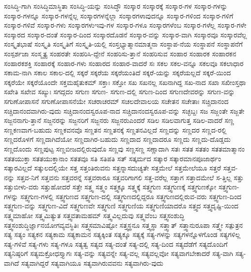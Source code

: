 {ಸಂಸಿದ್ಧಿ-ಗಾಗಿ
ಸಂಸಿದ್ಧಿಮಾಸ್ಥಿತಾ
ಸಂಸಿದ್ಧಿ-ಯನ್ನು
ಸಂಸಿದ್ಧೌ
ಸಂಸ್ಕಾರ
ಸಂಸ್ಕಾರಕ್ಕೆ
ಸಂಸ್ಕಾರ-ಗಳ
ಸಂಸ್ಕಾರ-ಗಳನ್ನು
ಸಂಸ್ಕಾರ-ಗಳನ್ನೂ
ಸಂಸ್ಕಾರ-ಗಳನ್ನೆಲ್ಲ
ಸಂಸ್ಕಾರಗಳನ್ನೆಲ್ಲಾ
ಸಂಸ್ಕಾರಗಳಾವುದನ್ನೂ
ಸಂಸ್ಕಾರ-ಗಳಿಂದ
ಸಂಸ್ಕಾರ-ಗಳಿಗೆ
ಸಂಸ್ಕಾರ-ಗಳಿವೆ
ಸಂಸ್ಕಾರ-ಗಳು
ಸಂಸ್ಕಾರಗಳುಇವು-ಗಳ
ಸಂಸ್ಕಾರ-ಗಳೂ
ಸಂಸ್ಕಾರಗಳೆಂಬ
ಸಂಸ್ಕಾರ-ಗಳೆಲ್ಲ
ಸಂಸ್ಕಾರ-ಗಳೇ
ಸಂಸ್ಕಾರದ
ಸಂಸ್ಕಾರ-ದಂತೆ
ಸಂಸ್ಕಾರ-ದಿಂದ
ಸಂಸ್ಕಾರದೊಡನೆ
ಸಂಸ್ಕಾರ-ವನ್ನು
ಸಂಸ್ಕಾರ-ವಾಗಿ
ಸಂಸ್ಕಾರವೂ
ಸಂಸ್ಕಾರವೆಲ್ಲ
ಸಂಸ್ಕೃತಭಾಷೆ
ಸಂಸ್ಕೃತಿ
ಸಂಸ್ಕೃತಿಗೆ
ಸಂಸ್ಕೃತಿ-ಯಲ್ಲಿ
ಸಂಸ್ತಭ್ಯಾತ್ಮಾನಮಾತ್ಮನಾ
ಸಂಸ್ಥಾಪ-ನೆಯ
ಸಂಸ್ಥಾಪನೆ
ಸಂಸ್ಥಾಪನೆಗೆ
ಸಂಸ್ಪರ್ಶಜಾ
ಸಂಸ್ಮೃತ್ಯ
ಸಂಹರತೇ
ಸಂಹರಿಸಿ-ದ್ದೇನೆ
ಸಂಹರಿಸು-ತ್ತಾನೆ
ಸಂಹರಿಸುವ
ಸಂಹಾರ
ಸಂಹಾರಕ
ಸಂಹಾರಕನ
ಸಂಹಾರಕಶಕ್ತಿ
ಸಂಹಾರಕ್ಕೆ
ಸಂಹಾರ-ಗಳು
ಸಂಹಾರದ
ಸಂಹಾರ-ವಾದರೆ
ಸಃ
ಸಕಲ
ಸಕಲ-ವನ್ನೂ
ಸಕಲವೂ
ಸಕಲಾಧಾರ
ಸಕಾಮ-ನಾಗಿ
ಸಕಾಲ
ಸಕಾಲ-ದಲ್ಲಿ
ಸಕ್ಕರೆ
ಸಕ್ಕರೆಯ
ಸಕ್ಕರೆಯಂತಿದೆ
ಸಕ್ಕರೆ-ಯನ್ನು
ಸಕ್ಕರೆಯಲ್ಲದೆ
ಸಕ್ಕರೆ-ಯಿಂದ
ಸಕ್ಕರೆಯೇ
ಸಕ್ಕರೆಯೊಂದೇ
ಸಕ್ತಮಹೈತುಕಮ್
ಸಕ್ತಾಃ
ಸಕ್ತೋ
ಸಖ
ಸಖನಲ್ಲ
ಸಖನಾಗಿದ್ದ
ಸಖ-ನಾದ
ಸಖಾ
ಸಖೀಂಸ್ತಥಾ
ಸಖೇತಿ
ಸಖೇವ
ಸಖ್ಯುಃ
ಸಗದ್ಗದಂ
ಸಗುಣ
ಸಗುಣ-
ಸಗುಣ-ದಲ್ಲಿ
ಸಗುಣ-ದಿಂದ
ಸಗುಣದೇವರನ್ನು
ಸಗುಣ-ವನ್ನು
ಸಗುಣೋಪಾಸನೆ
ಸಗುಣೋಪಾಸನೆಯೇ
ಸಚರಾಚರಮ್
ಸಚಲದೇವಾಲಯ
ಸಚೇತನ
ಸಚೇತಾಃ
ಸಚ್ಚಿದಾನಂದ
ಸಚ್ಚಿದಾನಂದವಾಗಿರು-ವುದು
ಸಚ್ಚಿದಾನಂದಸ್ವರೂಪ-ನಾದ
ಸಚ್ಚಿದಾನಂದಸ್ವರೂಪ-ವನ್ನು
ಸಚ್ಛಬ್ದಃ
ಸಜ
ಸಜ್ಜಂತೇ
ಸಜ್ಜತೇ
ಸಜ್ಜನನಾಗು-ತ್ತಾನೆ
ಸಜ್ಜನರನ್ನು
ಸಜ್ಜನರಿಗೆ
ಸಜ್ಜನರು
ಸಜ್ಜನರುಎಂದರೆ
ಸಡಿಲ
ಸಡಿಲವಾಗುತ್ತ
ಸಡಿಲ-ವಾದರೆ
ಸಣ್ಣ
ಸಣ್ಣಕಣವಾಗ-ಬಹುದು
ಸಣ್ಣಕವನವೊ
ಸಣ್ಣತನ
ಸಣ್ಣತನಕ್ಕೆ
ಸಣ್ಣತನವಿಲ್ಲದೆ
ಸಣ್ಣದನ್ನು
ಸಣ್ಣದರ
ಸಣ್ಣದ-ರಲ್ಲಿ
ಸಣ್ಣದರೊಳಗೆ
ಸಣ್ಣದಾಗಿದೆಯೋ
ಸಣ್ಣದಾಗಿರ-ಬಹುದು
ಸಣ್ಣದಾದ
ಸಣ್ಣದಾದರೂ
ಸಣ್ಣದು
ಸಣ್ಣದು-ದೊಡ್ಡದು
ಸಣ್ಣದೊಂದು
ಸಣ್ಣಪುಟ್ಟ
ಸಣ್ಣಬೀಜದಲ್ಲಿರುವುದೊ
ಸಣ್ಣವು
ಸಣ್ಣಸಣ್ಣ
ಸಣ್ಣಾದಾಗಿ
ಸತಃ
ಸತತ
ಸತತಂ
ಸತತಮಾತ್ಮಾನಂ
ಸತತಯುಕ್ತಾ
ಸತತಯುಕ್ತಾನಾಂ
ಸತತವೂ
ಸತಿ
ಸತಿಪತಿ
ಸತ್
ಸತ್ಕರ್ಮದ
ಸತ್ಕಾರ
ಸತ್ಕಾರಮಾನಪೂಜಾರ್ಥಂ
ಸತ್ಕಾರವಿಲ್ಲದೆ
ಸತ್ಕುಲದಲ್ಲಿಯೇ
ಸತ್ತ
ಸತ್ತಂತಿರುವನು
ಸತ್ತನ್ನಾಸದುಚ್ಯತೇ
ಸತ್ತಮೇಲೆ
ಸತ್ತಮೇಲೆಯೂ
ಸತ್ತರೆ
ಸತ್ತವ-ನನ್ನು
ಸತ್ತವ-ನಿಗೆ
ಸತ್ತವನು
ಸತ್ತವರನ್ನೆ
ಸತ್ತವರಾರೂ
ಸತ್ತವರಿಗಾಗಲಿ
ಸತ್ತ-ವರೆಲ್ಲ
ಸತ್ತಾಗ
ಸತ್ತಾದಮೇಲೆ
ಸ-ತ್ತಿಲ್ಲ
ಸತ್ತು
ಸತ್ತುಬೀಳು-ವರು
ಸತ್ತುಹೋದರೆ
ಸತ್ತೇ
ಸತ್ತ್ವ
ಸತ್ತ್ವಂ
ಸತ್ತ್ವಕ್ಕೂ
ಸತ್ತ್ವಕ್ಕೆ
ಸತ್ತ್ವಗುಣ
ಸತ್ತ್ವಗುಣಕ್ಕೆ
ಸತ್ತ್ವಗುಣಕ್ಕೋ
ಸತ್ತ್ವಗುಣ-ಗಳನ್ನು
ಸತ್ತ್ವಗುಣ-ಗಳಲ್ಲಿ
ಸತ್ತ್ವಗುಣದ
ಸತ್ತ್ವಗುಣ-ದಲ್ಲಿ
ಸತ್ತ್ವಗುಣದಲ್ಲಿದ್ದರೂ
ಸತ್ತ್ವಗುಣದಲ್ಲಿರುವ-ವರು
ಸತ್ತ್ವಗುಣ-ದಿಂದ
ಸತ್ತ್ವಗುಣ-ವನ್ನು
ಸತ್ತ್ವಗುಣ-ವಿದೆ
ಸತ್ತ್ವಗುಣವೇ
ಸತ್ತ್ವಗುಣಿ
ಸತ್ತ್ವಗುಣಿಯ
ಸತ್ತ್ವಗುಣಿಯಾದರೊ
ಸತ್ತ್ವದ
ಸತ್ತ್ವದೃಷ್ಟಿ-ಯಿಂದ
ಸತ್ತ್ವಮಾಹೋ
ಸತ್ತ್ವಮಿತ್ಯುತ
ಸತ್ತ್ವವತಾಮಹಮ್
ಸತ್ತ್ವವಿಲ್ಲದುವು
ಸತ್ತ್ವವೆಂಬ
ಸತ್ತ್ವಸಂಶುದ್ಧಿ
ಸತ್ತ್ವಸಂಶುದ್ಧಿರ್ಜ್ಞಾನಯೋಗವ್ಯವಸ್ಥಿತಿಃ
ಸತ್ತ್ವಸಮಾವಿಷ್ಟೋ
ಸತ್ತ್ವಸ್ಥನೂ
ಸತ್ತ್ವಸ್ಥಾ
ಸತ್ತ್ವಾತ್
ಸತ್ತ್ವಾನುರೂಪಾ
ಸತ್ತ್ವೇ
ಸತ್ಪುತ್ರನ
ಸತ್ಯ
ಸತ್ಯಂ
ಸತ್ಯಕನ
ಸತ್ಯಕಾಮ
ಸತ್ಯಕಾಮನ
ಸತ್ಯಕ್ಕಿಂತ
ಸತ್ಯಕ್ಕೂ
ಸತ್ಯಕ್ಕೆ
ಸತ್ಯ-ಗಳನ್ನು
ಸತ್ಯಗಳನ್ನೊಳಗೊಂಡ
ಸತ್ಯಗಳಿಲ್ಲ
ಸತ್ಯ-ಗಳಿವೆ
ಸತ್ಯ-ಗಳು
ಸತ್ಯ-ಗಳೂ
ಸತ್ಯತ್ವ
ಸತ್ಯದ
ಸತ್ಯ-ದಂತೆ
ಸತ್ಯ-ದಲ್ಲಿ
ಸತ್ಯ-ದಿಂದ
ಸತ್ಯದೆಡೆಗೆ
ಸತ್ಯದೊಂದಿಗೆ
ಸತ್ಯನಿಷ್ಠರಿಗೆ
ಸತ್ಯಮಕ್ರೋಧಸ್ತ್ಯಾಗಃ
ಸತ್ಯ-ವನ್ನು
ಸತ್ಯವನ್ನೇ
ಸತ್ಯ-ವಲ್ಲ
ಸತ್ಯವಲ್ಲವೋ
ಸತ್ಯವಾಗಬೇಕಾದರೆ
ಸತ್ಯ-ವಾಗಿ
ಸತ್ಯ-ವಾಗಿದೆ
ಸತ್ಯವಾಗಿದ್ದರೆ
ಸತ್ಯವಾಗಿಯೂ
ಸತ್ಯವಾಗಿರುವವನು
ಸತ್ಯವಾಗಿರು-ವುದು
}
